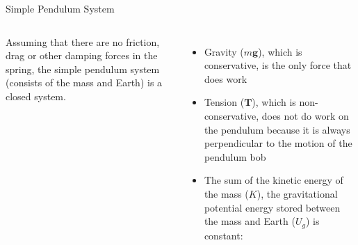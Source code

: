 \documentclass[12pt,compress,aspectratio=169]{beamer}
\begin{document}
\begin{frame}{Simple Pendulum System}
  \begin{columns}
    Assuming that there are no friction, drag or other damping forces in the
    spring, the simple pendulum system (consists of the mass and Earth) is a
    closed system.
    \begin{itemize}
    \item Gravity ($m\bm g$), which is conservative, is the only force that
      does work
    \item Tension ($\bm T$), which is non-conservative, does not do work on the
      pendulum because it is always perpendicular to the motion of the pendulum
      bob
    \item The sum of the kinetic energy of the mass ($K$), the gravitational
      potential energy stored between the mass and Earth ($U_g$) is constant:

    \end{itemize}
    
    \centering
  \end{columns}
\end{frame}
\end{document}
